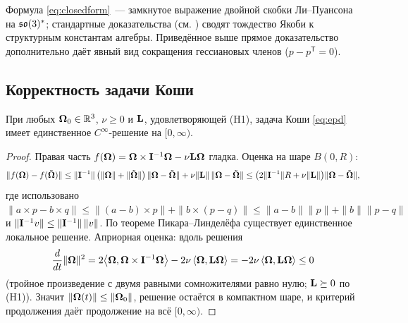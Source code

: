 \begin{remark}
Формула \eqref{eq:closedform}~--- замкнутое выражение двойной скобки
Ли--Пуансона на $\mathfrak{so}(3)^{*}$; стандартные доказательства (см.
\cite{marsdenratiu,arnoldkhesin}) сводят тождество Якоби к
структурным константам алгебры. Приведённое выше прямое доказательство
дополнительно даёт явный вид сокращения гессиановых членов
($p - p^{\mathsf T} = 0$).
\end{remark}

\subsection{Корректность задачи Коши}

\begin{theorem}\label{th:wp}
При любых $\boldsymbol{\Omega}_0 \in \mathbb{R}^3$, $\nu \ge 0$ и $\mathbf{L}$, удовлетворяющей
\textup{(H1)}, задача Коши \eqref{eq:epd} имеет единственное
$C^\infty$-решение на $[0,\infty)$.
\end{theorem}

\begin{proof}
Правая часть $f(\boldsymbol{\Omega}) = \boldsymbol{\Omega}\times\mathbf{I}^{-1}\boldsymbol{\Omega} - \nu\mathbf{L}\boldsymbol{\Omega}$ гладка.
Оценка на шаре $B(0,R)$:
\[
  \|f(\boldsymbol{\Omega}) - f(\tilde{\boldsymbol{\Omega}})\|
  \le \|\mathbf{I}^{-1}\|\,\bigl(\|\boldsymbol{\Omega}\| + \|\tilde{\boldsymbol{\Omega}}\|\bigr)\,\|\boldsymbol{\Omega}-\tilde{\boldsymbol{\Omega}}\|
     + \nu\|\mathbf{L}\|\,\|\boldsymbol{\Omega}-\tilde{\boldsymbol{\Omega}}\|
  \le \bigl(2\|\mathbf{I}^{-1}\|R + \nu\|\mathbf{L}\|\bigr)\|\boldsymbol{\Omega}-\tilde{\boldsymbol{\Omega}}\|,
\]
где использовано $\|a\times p - b\times q\|
\le \|(a-b)\times p\| + \|b\times(p-q)\| \le \|a-b\|\|p\| + \|b\|\|p-q\|$
и $\|\mathbf{I}^{-1}v\| \le \|\mathbf{I}^{-1}\|\,\|v\|$. По теореме
Пикара--Линделёфа существует единственное локальное решение.
Априорная оценка: вдоль решения
\[
  \frac{d}{dt}\|\boldsymbol{\Omega}\|^2 = 2\bigl\langle \boldsymbol{\Omega},\boldsymbol{\Omega}\times\mathbf{I}^{-1}\boldsymbol{\Omega}\bigr\rangle
  - 2\nu\,\langle\boldsymbol{\Omega},\mathbf{L}\boldsymbol{\Omega}\rangle = -2\nu\,\langle\boldsymbol{\Omega},\mathbf{L}\boldsymbol{\Omega}\rangle \le 0
\]
(тройное произведение с двумя равными сомножителями равно нулю;
$\mathbf{L} \succeq 0$ по \textup{(H1)}). Значит $\|\boldsymbol{\Omega}(t)\| \le \|\boldsymbol{\Omega}_0\|$,
решение остаётся в компактном шаре, и критерий продолжения
\cite[гл.~II]{hartman} даёт продолжение на всё $[0,\infty)$.
\end{proof}
